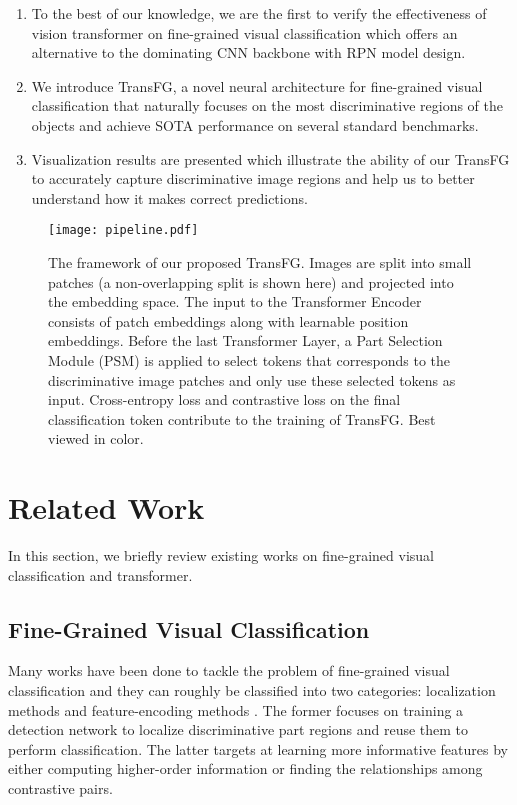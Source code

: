 \documentclass[10pt,twocolumn,letterpaper]{article}
\begin{document}
\begin{enumerate}
    \item To the best of our knowledge, we are the first to verify the effectiveness of vision transformer on fine-grained visual classification which offers an alternative to the dominating CNN backbone with RPN model design.
    \item We introduce TransFG, a novel neural architecture for fine-grained visual classification that naturally focuses on the most discriminative regions of the objects and achieve SOTA performance on several standard benchmarks.
    \item Visualization results are presented which illustrate the ability of our TransFG to accurately capture discriminative image regions and help us to better understand how it makes correct predictions.
\end{enumerate} \begin{figure*}
    \centering
    \texttt{[image: pipeline.pdf]}
    \caption{The framework of our proposed TransFG. Images are split into small patches (a non-overlapping split is shown here) and projected into the embedding space. The input to the Transformer Encoder consists of patch embeddings along with learnable position embeddings. Before the last Transformer Layer, a Part Selection Module (PSM) is applied to select tokens that corresponds to the discriminative image patches and only use these selected tokens as input. Cross-entropy loss and contrastive loss on the final classification token contribute to the training of TransFG. Best viewed in color.}
    \label{fig:model}
\end{figure*}


\section{Related Work}

In this section, we briefly review existing works on fine-grained visual classification and transformer.

\subsection{Fine-Grained Visual Classification}
Many works have been done to tackle the problem of fine-grained visual classification and they can roughly be classified into two categories: localization methods \cite{ge2019weakly, liu2020filtration, ding2019selective, zheng2019looking, yang2018learning, yang2021rerank} and feature-encoding methods \cite{yu2018hierarchical, zheng2019learning, gao2020channel, zhuang2020learning, luo2019cross}. The former focuses on training a detection network to localize discriminative part regions and reuse them to perform classification. The latter targets at learning more informative features by either computing higher-order information or finding the relationships among contrastive pairs.
\end{document}
